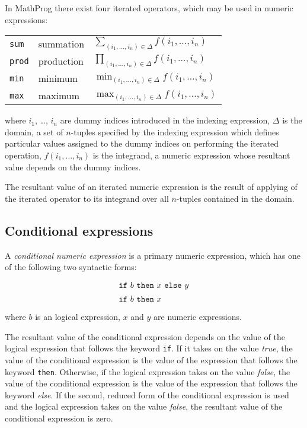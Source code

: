 \documentclass[11pt]{report}
\begin{document}
In MathProg there exist four iterated operators, which may be used in
numeric expressions:

{\def\arraystretch{2}
\noindent\hfil
\begin{tabular}{@{}lll@{}}
{\tt sum}&summation&$\displaystyle\sum_{(i_1,\dots,i_n)\in\Delta}
f(i_1,\dots,i_n)$\\
{\tt prod}&production&$\displaystyle\prod_{(i_1,\dots,i_n)\in\Delta}
f(i_1,\dots,i_n)$\\
{\tt min}&minimum&$\displaystyle\min_{(i_1,\dots,i_n)\in\Delta}
f(i_1,\dots,i_n)$\\
{\tt max}&maximum&$\displaystyle\max_{(i_1,\dots,i_n)\in\Delta}
f(i_1,\dots,i_n)$\\
\end{tabular}
}

\noindent where $i_1$, \dots, $i_n$ are dummy indices introduced in
the indexing expression, $\Delta$ is the domain, a set of $n$-tuples
specified by the indexing expression which defines particular values
assigned to the dummy indices on performing the iterated operation,
$f(i_1,\dots,i_n)$ is the integrand, a numeric expression whose
resultant value depends on the dummy indices.

The resultant value of an iterated numeric expression is the result of
applying of the iterated operator to its integrand over all $n$-tuples
contained in the domain.

\subsection{Conditional expressions}
\label{ifthen}

A {\it conditional numeric expression} is a primary numeric expression,
which has one of the following two syntactic forms:
$$
{\def\arraystretch{1.4}
\begin{array}{l}
\mbox{{\tt if} $b$ {\tt then} $x$ {\tt else} $y$}\\
\mbox{{\tt if} $b$ {\tt then} $x$}\\
\end{array}
}
$$
where $b$ is an logical expression, $x$ and $y$ are numeric
expressions.

The resultant value of the conditional expression depends on the value
of the logical expression that follows the keyword {\tt if}. If it
takes on the value {\it true}, the value of the conditional expression
is the value of the expression that follows the keyword {\tt then}.
Otherwise, if the logical expression takes on the value {\it false},
the value of the conditional expression is the value of the expression
that follows the keyword {\it else}. If the second, reduced form of the
conditional expression is used and the logical expression takes on the
value {\it false}, the resultant value of the conditional expression is
zero.
\end{document}
